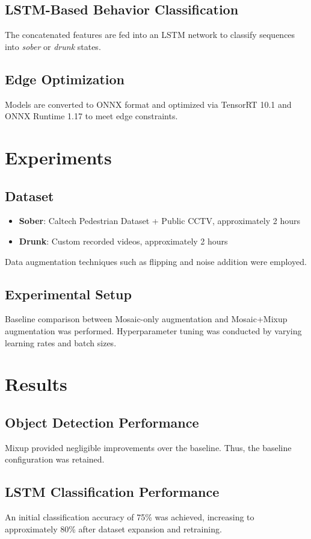 \documentclass[conference]{IEEEtran}
\begin{document}
\subsection{LSTM-Based Behavior Classification}
The concatenated features are fed into an LSTM network to classify sequences into \textit{sober} or \textit{drunk} states.

\subsection{Edge Optimization}
Models are converted to ONNX format and optimized via TensorRT 10.1 and ONNX Runtime 1.17 to meet edge constraints.

\section{Experiments}
\subsection{Dataset}
\begin{itemize}
    \item \textbf{Sober}: Caltech Pedestrian Dataset + Public CCTV, approximately 2 hours
    \item \textbf{Drunk}: Custom recorded videos, approximately 2 hours
\end{itemize}
Data augmentation techniques such as flipping and noise addition were employed.

\subsection{Experimental Setup}
Baseline comparison between Mosaic-only augmentation and Mosaic+Mixup augmentation was performed. Hyperparameter tuning was conducted by varying learning rates and batch sizes.

\section{Results}
\subsection{Object Detection Performance}
Mixup provided negligible improvements over the baseline. Thus, the baseline configuration was retained.

\subsection{LSTM Classification Performance}
An initial classification accuracy of 75\% was achieved, increasing to approximately 80\% after dataset expansion and retraining.
\end{document}
